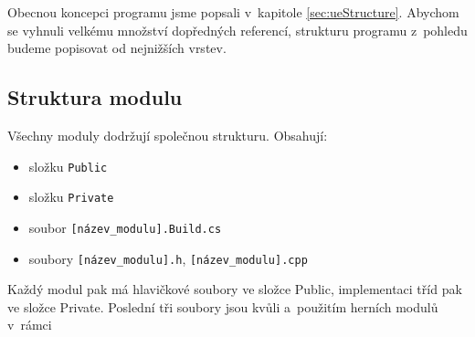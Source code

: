 \FloatBarrier

Obecnou koncepci programu jsme popsali v~kapitole \ref{sec:ueStructure}. Abychom se vyhnuli velkému množství dopředných referencí, strukturu programu z~pohledu \CPP{} budeme popisovat od nejnižších vrstev.

\subsection{Struktura modulu}
Všechny moduly dodržují společnou strukturu. Obsahují:
\begin{itemize}
	\item složku \verb!Public!
	\item složku \verb!Private!
	\item soubor \verb![název_modulu].Build.cs!
	\item soubory \verb![název_modulu].h!, \verb![název_modulu].cpp!
\end{itemize}


Každý modul pak má hlavičkové soubory ve složce Public, implementaci tříd pak ve složce Private. Poslední tři soubory jsou kvůli \UBT{} a~použitím herních modulů v~rámci \UE{}












